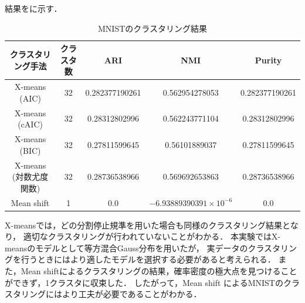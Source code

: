 結果をに示す．

\begin{table}[htb]
  \centering
  \caption{MNISTのクラスタリング結果}
  \label{table:mnist}
  \begin{tabular}{|c|c|c|c|c|} \hline
    クラスタリング手法 & クラスタ数 & ARI & NMI & Purity \\\hline
    X-means (AIC) & 32 & 0.282377190261 & 0.562954278053 & 0.282377190261\\
    X-means (cAIC) & 32 & 0.28312802996 & 0.562243771104 & 0.28312802996\\
    X-means (BIC) & 32 & 0.27811599645 & 0.56101889037 & 0.27811599645\\
    X-means (対数尤度関数)& 32 & 0.28736538966 & 0.569692653863 & 0.28736538966\\
    Mean shift & 1 & 0.0 & $-6.93889390391 \times 10^{-6}$ & 0.0\\\hline
  \end{tabular}
\end{table}

X-meansでは，どの分割停止規準を用いた場合も同様のクラスタリング結果となり，
適切なクラスタリングが行われていないことがわかる．
本実験ではX-meansのモデルとして等方混合Gauss分布を用いたが，
実データのクラスタリングを行うときにはより適したモデルを選択する必要があると考えられる．
また，Mean shiftによるクラスタリングの結果，確率密度の極大点を見つけることができず，1クラスタに収束した．
したがって，Mean shift によるMNISTのクラスタリングにはより工夫が必要であることがわかる．
